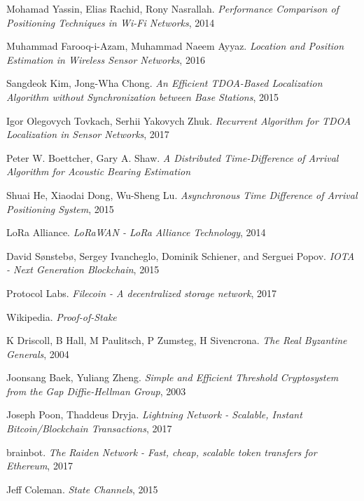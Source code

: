 \documentclass[10pt, nonatbib, nocopyrightspace, reprint]{sigplanconf}
\begin{document}
\begin{thebibliography}{10}
    Mohamad Yassin, Elias Rachid, Rony Nasrallah.
    \emph{Performance Comparison of Positioning Techniques in Wi-Fi Networks}, 2014

    Muhammad Farooq-i-Azam, Muhammad Naeem Ayyaz.
    \emph{Location and Position Estimation in Wireless Sensor Networks}, 2016

    Sangdeok Kim, Jong-Wha Chong.
    \emph{An Efficient TDOA-Based Localization Algorithm without Synchronization between Base Stations}, 2015

    Igor Olegovych Tovkach, Serhii Yakovych Zhuk.
    \emph{Recurrent Algorithm for TDOA Localization in Sensor Networks}, 2017

    Peter W. Boettcher, Gary A. Shaw.
    \emph{A Distributed Time-Difference of Arrival Algorithm for Acoustic Bearing Estimation}

    Shuai He, Xiaodai Dong, Wu-Sheng Lu.
    \emph{Asynchronous Time Difference of Arrival Positioning System}, 2015

    LoRa Alliance.
    \emph{LoRaWAN - LoRa Alliance Technology}, 2014

    David Sønstebø, Sergey Ivancheglo, Dominik Schiener, and Serguei Popov.
    \emph{IOTA - Next Generation Blockchain}, 2015

    Protocol Labs.
    \emph{Filecoin - A decentralized storage network}, 2017

    Wikipedia.
    \emph{Proof-of-Stake}

    K Driscoll, B Hall, M Paulitsch, P Zumsteg, H Sivencrona.
    \emph{The Real Byzantine Generals}, 2004

    Joonsang Baek, Yuliang Zheng.
    \emph{Simple and Efficient Threshold Cryptosystem from the Gap Diffie-Hellman Group}, 2003

    Joseph Poon, Thaddeus Dryja.
    \emph{Lightning Network - Scalable, Instant Bitcoin/Blockchain Transactions}, 2017

    brainbot.
    \emph{The Raiden Network - Fast, cheap, scalable token transfers for Ethereum}, 2017

    Jeff Coleman.
    \emph{State Channels}, 2015

\end{thebibliography}
\end{document}
